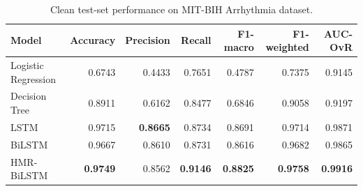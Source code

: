 \begin{table}[h!]
\centering
\caption{Clean test-set performance on MIT-BIH Arrhythmia dataset.}
\label{tab:clean_perf}
\begin{tabular}{lrrrrrr}
\toprule
Model & Accuracy & Precision & Recall & F1-macro & F1-weighted & AUC-OvR \\
\midrule
Logistic Regression & 0.6743 & 0.4433 & 0.7651 & 0.4787 & 0.7375 & 0.9145 \\
Decision Tree & 0.8911 & 0.6162 & 0.8477 & 0.6846 & 0.9058 & 0.9197 \\
LSTM & 0.9715 & \textbf{0.8665} & 0.8734 & 0.8691 & 0.9714 & 0.9871 \\
BiLSTM & 0.9667 & 0.8610 & 0.8731 & 0.8616 & 0.9682 & 0.9865 \\
HMR-BiLSTM & \textbf{0.9749} & 0.8562 & \textbf{0.9146} & \textbf{0.8825} & \textbf{0.9758} & \textbf{0.9916} \\
\bottomrule
\end{tabular}
\end{table}